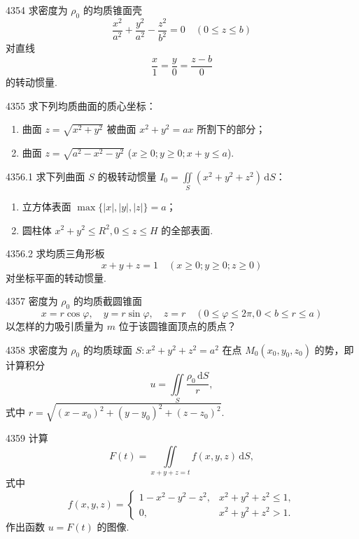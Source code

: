 \begin{prob}[M]{4354}
求密度为 $\rho_0$ 的均质锥面壳
\[
\frac{x^2}{a^2} + \frac{y^2}{a^2} - \frac{z^2}{b^2} = 0 \quad (0 \leqslant z \leqslant b)
\]
对直线
\[
\frac{x}{1} = \frac{y}{0} = \frac{z - b}{0}
\]
的转动惯量.
\end{prob}

\begin{prob}[M]{4355}
求下列均质曲面的质心坐标：
\begin{enumerate}[label=(\alph*), itemsep=2pt, topsep=3pt]
    \item 曲面 $z = \sqrt{x^2 + y^2}$ 被曲面 $x^2 + y^2 = ax$ 所割下的部分；
    \item 曲面 $z = \sqrt{a^2 - x^2 - y^2}$ ($x \geqslant 0; y \geqslant 0; x + y \leqslant a$).
\end{enumerate}
\end{prob}

\begin{prob}[M]{4356.1}
求下列曲面 $S$ 的极转动惯量 $I_0 = \iint\limits_S (x^2 + y^2 + z^2)\,\mathrm{d}S$：
\begin{enumerate}[label=(\alph*), itemsep=2pt, topsep=3pt]
    \item 立方体表面 $\max\{|x|, |y|, |z|\} = a$；
    \item 圆柱体 $x^2 + y^2 \leqslant R^2, 0 \leqslant z \leqslant H$ 的全部表面.
\end{enumerate}
\end{prob}

\begin{prob}[M]{4356.2}
求均质三角形板
\[
x + y + z = 1 \quad (x \geqslant 0; y \geqslant 0; z \geqslant 0)
\]
对坐标平面的转动惯量.
\end{prob}

\begin{prob}[M]{4357}
密度为 $\rho_0$ 的均质截圆锥面
\[
x = r\cos\varphi, \quad y = r\sin\varphi, \quad z = r \quad (0 \leqslant \varphi \leqslant 2\pi, 0 < b \leqslant r \leqslant a)
\]
以怎样的力吸引质量为 $m$ 位于该圆锥面顶点的质点？
\end{prob}

\begin{prob}[M]{4358}
求密度为 $\rho_0$ 的均质球面 $S: x^2 + y^2 + z^2 = a^2$ 在点 $M_0(x_0, y_0, z_0)$ 的势，即计算积分
\[
u = \iint\limits_S \frac{\rho_0\,\mathrm{d}S}{r},
\]
式中 $r = \sqrt{(x - x_0)^2 + (y - y_0)^2 + (z - z_0)^2}$.
\end{prob}

\begin{prob}[L]{4359}
计算
\[
F(t) = \iint\limits_{x + y + z = t} f(x, y, z)\,\mathrm{d}S,
\]
式中
\[
f(x, y, z) = \begin{cases} 1 - x^2 - y^2 - z^2, & x^2 + y^2 + z^2 \leqslant 1, \\ 0, & x^2 + y^2 + z^2 > 1. \end{cases}
\]
作出函数 $u = F(t)$ 的图像.
\end{prob}

